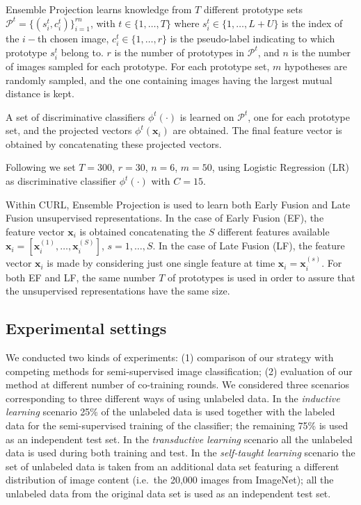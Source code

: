 \documentclass[journal,11pt]{IEEEtran}
\newcommand{\ADD}[1]{#1}
\newcommand{\coso}{strategy}
\begin{document}
Ensemble Projection learns knowledge from $T$ different prototype sets $\mathcal{P}^t = \{ (s_i^t,c_i^t) \}_{i=1}^{rn}$, with $ t \in \{1, \ldots, T\}$ where $s_i^t \in \{1, \ldots, L+U \}$ is the index of the $i-$th chosen image, $c_i^t \in \{1, \ldots, r \}$ is the pseudo-label indicating to which prototype $s_i^t$ belong to. $r$ is the number of prototypes 
in $\mathcal{P}^t$, and $n$ is the number of images sampled for each prototype. 
For each prototype set, $m$ hypotheses are randomly sampled, and the one containing images having the largest mutual distance is kept.  

A set of discriminative classifiers $\phi^t(\cdot)$ is learned on $\mathcal{P}^t$, one for each prototype set, and the projected vectors $\phi^t(\mathbf{x}_i)$ are obtained. The final feature vector is obtained by concatenating these projected vectors. 

Following \cite{dai2013ensemble} we set $T=300$, $r=30$, $n=6$, $m=50$, using Logistic Regression (LR) as discriminative classifier $\phi^t(\cdot)$ with $C=15$. %

\ADD{Within CURL}, Ensemble Projection is used to learn both Early Fusion and Late Fusion unsupervised representations. 
In the case of Early Fusion (EF), the feature vector $\mathbf{x}_i$ is obtained concatenating the $S$ different features available $\mathbf{x}_i=[\mathbf{x}_i^{(1)},\ldots,\mathbf{x}_i^{(S)}]$, $s=1,\ldots,S$. In the case of Late Fusion (LF), the feature vector $\mathbf{x}_i$ is made by considering just one single feature at time $\mathbf{x}_i=\mathbf{x}_i^{(s)}$. 
For both EF and LF, the same number $T$ of prototypes is used in order to assure that the unsupervised representations have the same size. 

\subsection{Experimental settings}
We conducted two kinds of experiments: (1) comparison of our \coso{ }
with competing methods for semi-supervised image classification; (2)
evaluation of our method at different number of co-training rounds.
We considered three scenarios corresponding to three different ways of
using unlabeled data.  In the \emph{inductive learning} scenario 25\%
of the unlabeled data is used together with the labeled data for the
semi-supervised training of the classifier; the remaining 75\% is used
as an independent test set.  In the \emph{transductive learning}
scenario all the unlabeled data is used during both training and test.
In the \emph{self-taught learning} scenario the set of unlabeled data
is taken from an additional data set featuring a different
distribution of image content (i.e.~the 20,000 images from ImageNet);
all the unlabeled data from the original data set is used as an
independent test set.
\end{document}
